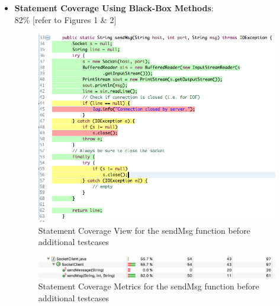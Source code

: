 \documentclass[fontsize=12pt,paper=letter,twoside]{scrartcl}
\begin{document}
\begin{itemize}
\item \textbf{Statement Coverage Using Black-Box Methods}: \\ 82\%  [refer to Figures 1 \& 2]
\begin{figure}[!htb]
\begin{center}
\includegraphics[width=.99\textwidth]{images/wbt/bvt/figure1.png}
\end{center}
\caption{Statement Coverage View for the sendMsg function before additional testcases}
\label{fig:wbt_bvt_code}
\end{figure}
\begin{figure}[!htb]
\begin{center}
\includegraphics[width=.99\textwidth]{images/wbt/bvt/figure2.png}
\end{center}
\caption{Statement Coverage Metrics for the sendMsg function before additional testcases}
\label{fig:wbt_bvt_code}
\end{figure}


\end{itemize}
\end{document}
